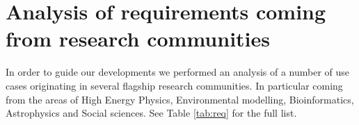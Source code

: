 \documentclass{article}
\begin{document}



\section{Analysis of requirements coming from research communities}
\label{sec:user-req}

In order to guide our developments we performed an analysis of a number of use cases originating in several flagship research communities. In particular coming from the areas of High Energy Physics, Environmental modelling, Bioinformatics, Astrophysics and Social sciences. See Table \ref{tab:req} for the full list.



\end{document}
